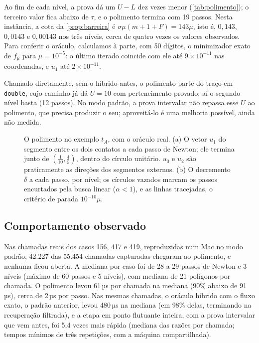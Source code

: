 \documentclass[11pt,a4paper]{article}
\theoremstyle{plain}\newtheorem{proposicao}{Proposição}
\theoremstyle{definition}\newtheorem{definicao}{Definição}
\theoremstyle{plain}\newtheorem{teorema}{Teorema}
\begin{document}
Ao fim de cada nível, a prova dá um \(U-L\) dez vezes menor (\cref{tab:polimento}); o terceiro valor fica abaixo de \(\tau\), e o polimento termina com 19 passos. Nesta instância, a cota da \cref{prop:barreira} é \(\sigma\mu(m+1+F)=143\mu\), isto é, \(0{,}143\), \(0{,}0143\) e \(0{,}00143\) nos três níveis, cerca de quatro vezes os valores observados. Para conferir o oráculo, calculamos à parte, com 50 dígitos, o minimizador exato de \(f_\mu\) para \(\mu=10^{-5}\): o último iterado coincide com ele até \(9\times10^{-11}\) nas coordenadas, e \(u_1\) até \(2\times10^{-11}\).

Chamado diretamente, sem o híbrido antes, o polimento parte do traço em \texttt{double}, cujo caminho já dá \(U=10\) com pertencimento provado; aí o segundo nível basta (12 passos). No modo padrão, a prova intervalar não repassa esse \(U\) ao polimento, que precisa produzir o seu; aproveitá-lo é uma melhoria possível, ainda não medida.

\begin{figure}[ht]\centering\figpolimento
\caption{O polimento no exemplo \(t_A\), com o oráculo real. (a) O vetor \(u_1\) do segmento entre os dois contatos a cada passo de Newton; ele termina junto de \((\tfrac1{10},\tfrac45)\), dentro do círculo unitário. \(u_0\) e \(u_2\) são praticamente as direções dos segmentos externos. (b) O decremento \(\delta\) a cada passo, por nível; os círculos vazados marcam os passos encurtados pela busca linear (\(\alpha<1\)), e as linhas tracejadas, o critério de parada \(10^{-10}\mu\).}\label{fig:polimento}
\end{figure}

\subsection{Comportamento observado}
Nas chamadas reais dos casos 156, 417 e 419, reproduzidas num Mac no modo padrão, 42.227 das 55.454 chamadas capturadas chegaram ao polimento, e nenhuma ficou aberta. A mediana por caso foi de 28 a 29 passos de Newton e 3 níveis (máximo de 60 passos e 5 níveis), com mediana de 21 polígonos por chamada. O polimento levou 61\,µs por chamada na mediana (90\% abaixo de 91\,µs), cerca de 2\,µs por passo. Nas mesmas chamadas, o oráculo híbrido com o fluxo exato, o padrão anterior, levou 480\,µs na mediana (em 98\% delas, terminando na recuperação filtrada), e a etapa em ponto flutuante inteira, com a prova intervalar que vem antes, foi 5,4 vezes mais rápida (mediana das razões por chamada; tempos mínimos de três repetições, com a máquina compartilhada).
\end{document}
